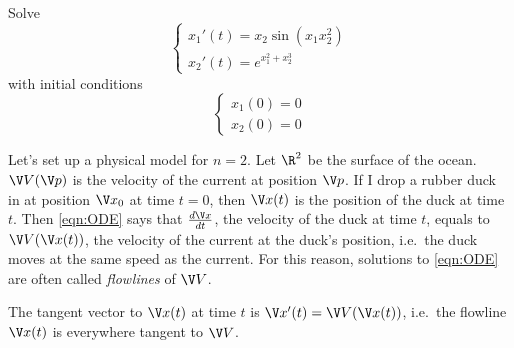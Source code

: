 \documentclass[a4paper]{article}
\theoremstyle{definition}
\begin{document}
\begin{eg}
  Solve
  \[
    \begin{cases}
      x_1'(t) = x_2 \sin(x_1x_2^2) \\
      x_2'(t) = e^{x_1^2 + x_2^3}
    \end{cases}
  \]
  with initial conditions
  \[
    \begin{cases}
      x_1(0) = 0 \\
      x_2(0) = 0
    \end{cases}
  \]
\end{eg}

Let's set up a physical model for \(n = 2\). Let \(\R^2\) be the surface of the ocean. \(\V V(\V p)\) is the velocity of the current at position \(\V p\). If I drop a rubber duck in at position \(\V x_0\) at time \(t = 0\), then \(\V x(t)\) is the position of the duck at time \(t\). Then \eqref{eqn:ODE} says that \(\frac{d\V x}{dt}\), the velocity of the duck at time \(t\), equals to \(\V V(\V x(t))\), the velocity of the current at the duck's position, i.e.\ the duck moves at the same speed as the current. For this reason, solutions to \eqref{eqn:ODE} are often called \emph{flowlines} of \(\V V\).

The tangent vector to \(\V x(t)\) at time \(t\) is \(\V x'(t) = \V V(\V x(t))\), i.e.\ the flowline \(\V x(t)\) is everywhere tangent to \(\V V\).
\end{document}
